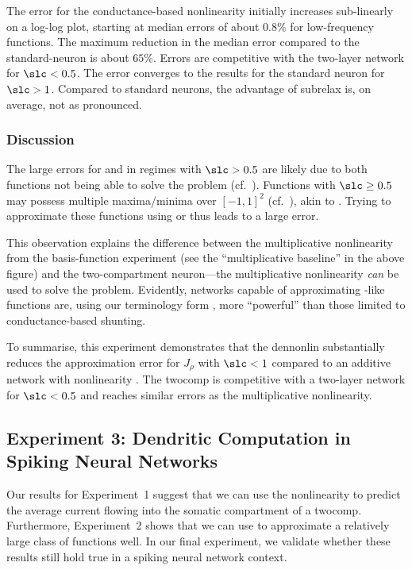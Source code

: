 The error for the conductance-based \twocomplif nonlinearity initially increases sub-linearly on a log-log plot, starting at median errors of about $0.8\%$ for low-frequency functions.
The maximum reduction in the median error compared to the standard-\LIF neuron is about $65\%$.
Errors are competitive with the two-layer network for $\slc < 0.5$.
The error converges to the results for the standard \LIF neuron for $\slc > 1$.
Compared to standard \LIF neurons, the advantage of \gls{subrelax} is, on average, not as pronounced.

\subsubsection{Discussion}
The large errors for \Hcur and \Hcond in regimes with $\slc > 0.5$ are likely due to both functions not being able to solve the \XOR problem (cf.~).
Functions with $\slc \geq 0.5$ may possess multiple maxima/minima over $[-1, 1]^2$ (cf.~), akin to \XOR.
Trying to approximate these functions using \Hcur or \Hcond thus leads to a large error.

This observation explains the difference between the multiplicative nonlinearity from the basis-function experiment (see the \enquote{multiplicative baseline} in the above figure) and the two-compartment \LIF neuron---the multiplicative nonlinearity \emph{can} be used to solve the \XOR problem.
Evidently, networks capable of approximating \XOR-like functions are, using our terminology form , more \enquote{powerful} than those limited to conductance-based shunting.

To summarise, this experiment demonstrates that the \twocomplif \gls{dennonlin} \Hcond substantially reduces the approximation error for $J_\rho$ with $\slc < 1$ compared to an additive network with nonlinearity \Hcur.
The \gls{twocomp} is competitive with a two-layer network for $\slc < 0.5$ and reaches similar errors as the multiplicative nonlinearity.


\subsection{Experiment 3: Dendritic Computation in Spiking Neural Networks}
\label{sec:two_comp_lif_experiment_3}

Our results for Experiment~1 suggest that we can use the \twocomplif nonlinearity \Hcond to predict the average current flowing into the somatic compartment of a \gls{twocomp}.
Furthermore, Experiment~2 shows that we can use \Hcond to approximate a relatively large class of functions well.
In our final experiment, we validate whether these results still hold true in a spiking neural network context.

